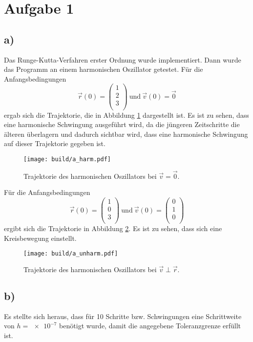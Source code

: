 \section*{Aufgabe 1}
\subsection*{a)}
Das Runge-Kutta-Verfahren erster Ordnung wurde implementiert. Dann wurde das
Programm an einem harmonischen Oszillator getestet.
Für die Anfangsbedingungen
\begin{equation*}
  \vec{r}(0) = \begin{pmatrix}
  1 \\ 2 \\ 3 \\
\end{pmatrix} \ \text{und} \
\vec{v}(0) = \vec{0}
\end{equation*}
ergab sich die Trajektorie, die in Abbildung \ref{fig:harm} dargestellt ist. Es
ist zu sehen, dass eine harmonische Schwingung ausgeführt wird, da die jüngeren
Zeitschritte die älteren überlagern und dadurch sichtbar wird, dass eine
harmonische Schwingung auf dieser Trajektorie gegeben ist.

\begin{figure}
  \centering
  \texttt{[image: build/a\_harm.pdf]}
  \caption{Trajektorie des harmonischen Oszillators bei $\vec{v} = \vec{0}$.}
  \label{fig:harm}
\end{figure}

Für die Anfangsbedingungen
\begin{equation*}
  \vec{r}(0) = \begin{pmatrix}
  1 \\ 0 \\ 3 \\
\end{pmatrix} \ \text{und} \
\vec{v}(0) = \begin{pmatrix}
  0 \\ 1 \\ 0 \\
\end{pmatrix}
\end{equation*}
ergibt sich die Trajektorie in Abbildung \ref{fig:unharm}. Es ist zu sehen, dass
sich eine Kreisbewegung einstellt.

\begin{figure}
  \centering
  \texttt{[image: build/a\_unharm.pdf]}
    \caption{Trajektorie des harmonischen Oszillators bei $\vec{v} \perp \vec{r}$.}
  \label{fig:unharm}
\end{figure}

\subsection*{b)}
Es stellte sich heraus, dass für 10 Schritte bzw. Schwingungen eine Schrittweite
von $h = \num{e-7}$ benötigt wurde, damit die angegebene Toleranzgrenze erfüllt
ist.
